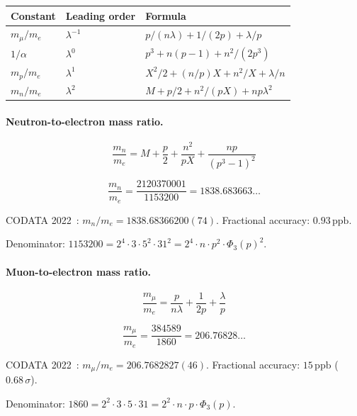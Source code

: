 \documentclass[12pt,a4paper]{article}
\theoremstyle{definition}
\newcommand{\Phithree}{\Phi_3}
\newcommand{\ppb}{\,\mathrm{ppb}}
\begin{document}
\begin{center}
\begin{tabular}{lll}
\toprule
Constant & Leading order & Formula \\
\midrule
$m_\mu/m_e$ & $\lambda^{-1}$ & $p/(n\lambda) + 1/(2p) + \lambda/p$ \\
$1/\alpha$   & $\lambda^0$    & $p^3 + n(p-1) + n^2/(2p^3)$ \\
$m_p/m_e$    & $\lambda^1$    & $X^2/2 + (n/p)X + n^2/X + \lambda/n$ \\
$m_n/m_e$    & $\lambda^2$    & $M + p/2 + n^2/(pX) + np\lambda^2$ \\
\bottomrule
\end{tabular}
\end{center}

\paragraph{Neutron-to-electron mass ratio.}
\begin{equation}\label{eq:neutron}
  \frac{m_n}{m_e} = M + \frac{p}{2} + \frac{n^2}{pX} + \frac{np}{(p^3-1)^2}
\end{equation}

\begin{equation}
  \frac{m_n}{m_e} = \frac{2120370001}{1153200} = 1838.683663\ldots
\end{equation}

CODATA 2022~\cite{codata2022}: $m_n/m_e = 1838.68366200(74)$.
Fractional accuracy: $0.93\ppb$.

Denominator: $1153200 = 2^4 \cdot 3 \cdot 5^2 \cdot 31^2 =
2^4 \cdot n \cdot p^2 \cdot \Phithree(p)^2$.

\paragraph{Muon-to-electron mass ratio.}
\begin{equation}\label{eq:muon}
  \frac{m_\mu}{m_e} = \frac{p}{n\lambda} + \frac{1}{2p} + \frac{\lambda}{p}
\end{equation}

\begin{equation}
  \frac{m_\mu}{m_e} = \frac{384589}{1860} = 206.76828\ldots
\end{equation}

CODATA 2022~\cite{codata2022}: $m_\mu/m_e = 206.7682827(46)$.
Fractional accuracy: $15\ppb$ ($0.68\,\sigma$).

Denominator: $1860 = 2^2 \cdot 3 \cdot 5 \cdot 31 =
2^2 \cdot n \cdot p \cdot \Phithree(p)$.
\end{document}
